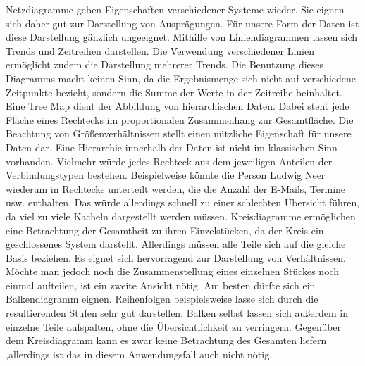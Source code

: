 Netzdiagramme geben Eigenschaften verschiedener Systeme wieder. Sie eignen sich daher gut zur Darstellung von Ausprägungen. Für unsere Form der Daten ist diese Darstellung gänzlich ungeeignet. Mithilfe von Liniendiagrammen lassen sich Trends und Zeitreihen darstellen. Die Verwendung verschiedener Linien ermöglicht zudem die Darstellung mehrerer Trends. Die Benutzung dieses Diagramms macht keinen Sinn, da die Ergebnismenge sich nicht auf verschiedene Zeitpunkte bezieht, sondern die Summe der Werte in der Zeitreihe beinhaltet. Eine Tree Map dient der Abbildung von hierarchischen Daten. Dabei steht jede Fläche eines Rechtecks im proportionalen Zusammenhang zur Gesamtfläche. Die Beachtung von Größenverhältnissen stellt einen nützliche Eigenschaft für unsere Daten dar. Eine Hierarchie innerhalb der Daten ist nicht im klassischen Sinn vorhanden. Vielmehr würde jedes Rechteck aus dem jeweiligen Anteilen der Verbindungstypen bestehen. Beispielweise könnte die Person Ludwig Neer wiederum in Rechtecke unterteilt werden, die die Anzahl der E-Mails, Termine usw. enthalten. Das würde allerdings schnell zu einer schlechten Übersicht führen, da viel zu viele Kacheln dargestellt werden müssen. Kreisdiagramme ermöglichen eine Betrachtung der Gesamtheit zu ihren Einzelstücken, da der Kreis ein geschlossenes System darstellt. Allerdings müssen alle Teile sich auf die gleiche Basis beziehen. Es eignet sich hervorragend zur Darstellung von Verhältnissen. Möchte man jedoch noch die Zusammenstellung eines einzelnen Stückes noch einmal aufteilen, ist ein zweite Ansicht nötig. Am besten dürfte sich ein Balkendiagramm eignen. Reihenfolgen beispielsweise lasse sich durch die resultierenden Stufen sehr gut darstellen. Balken selbst lassen sich außerdem in einzelne Teile aufspalten, ohne die Übersichtlichkeit zu verringern. Gegenüber dem Kreisdiagramm kann es zwar keine Betrachtung des Gesamten liefern ,allerdings ist das in diesem Anwendungsfall auch nicht nötig. 